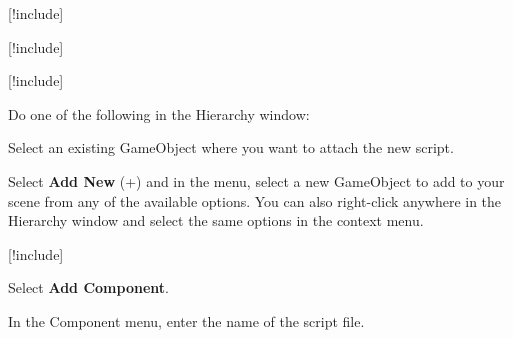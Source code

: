 \begin{DoxyEnumerate}
\item \mbox{[}!include\mbox{]}
\end{DoxyEnumerate}
\begin{DoxyEnumerate}
\item \mbox{[}!include\mbox{]}
\end{DoxyEnumerate}
\begin{DoxyEnumerate}
\item \mbox{[}!include\mbox{]}
\end{DoxyEnumerate}
\begin{DoxyEnumerate}
\item Do one of the following in the Hierarchy window\+:
\begin{DoxyItemize}
\item Select an existing Game\+Object where you want to attach the new script.
\item Select {\bfseries{Add New}} (+) and in the menu, select a new Game\+Object to add to your scene from any of the available options. You can also right-\/click anywhere in the Hierarchy window and select the same options in the context menu.
\end{DoxyItemize}
\end{DoxyEnumerate}
\begin{DoxyEnumerate}
\item \mbox{[}!include\mbox{]}
\end{DoxyEnumerate}
\begin{DoxyEnumerate}
\item Select {\bfseries{Add Component}}.
\end{DoxyEnumerate}
\begin{DoxyEnumerate}
\item In the Component menu, enter the name of the script file.
\end{DoxyEnumerate}
